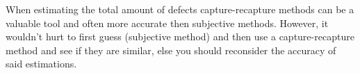 When estimating the total amount of defects capture-recapture methods can be a valuable tool and often more accurate then subjective methods. However, it wouldn't hurt to first guess (subjective method) and then use a capture-recapture method and see if they are similar, else you should reconsider the accuracy of said estimations.